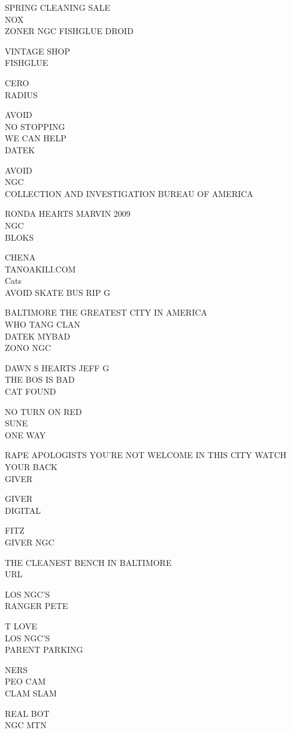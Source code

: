 \documentclass[10pt,letterpaper]{article}
\begin{document}
SPRING CLEANING SALE\\
NOX\\
ZONER NGC FISHGLUE DROID

VINTAGE SHOP\\
FISHGLUE

CERO\\
RADIUS

AVOID\\
NO STOPPING\\
WE CAN HELP\\
DATEK

AVOID\\
NGC\\
COLLECTION AND INVESTIGATION BUREAU OF AMERICA

RONDA HEARTS MARVIN 2009\\
NGC\\
BLOKS

CHENA\\
TANOAKILI.COM\\
Cats\\
AVOID SKATE BUS RIP G

BALTIMORE THE GREATEST CITY IN AMERICA\\
WHO TANG CLAN\\
DATEK MYBAD\\
ZONO NGC

DAWN S HEARTS JEFF G\\
THE BOS IS BAD\\
CAT FOUND

NO TURN ON RED\\
SUNE\\
ONE WAY

RAPE APOLOGISTS YOU'RE NOT WELCOME IN THIS CITY WATCH YOUR BACK\\
GIVER

GIVER\\
DIGITAL

FITZ\\
GIVER NGC

THE CLEANEST BENCH IN BALTIMORE\\
URL

LOS NGC'S\\
RANGER PETE

T LOVE\\
LOS NGC'S\\
PARENT PARKING

NERS\\
PEO CAM\\
CLAM SLAM

REAL BOT\\
NGC MTN
\end{document}
